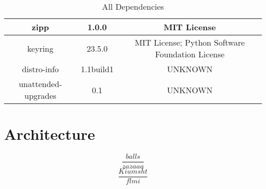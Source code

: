 \begin{table}[ht]
{\begin{tabular}{|c|c|c|}
zipp                & 1.0.0            & MIT License                                             \\ \hline
keyring             & 23.5.0           & MIT License; Python Software Foundation License         \\ \hline
distro-info         & 1.1build1        & UNKNOWN                                                 \\ \hline
unattended-upgrades & 0.1              & UNKNOWN                                                 \\ \hline
\end{tabular}%
}
\caption{All Dependencies}
\label{tab:dependencies}
\end{table}
                           


\section*{Architecture}

$$\frac{balls}{zazaaa}$$
$$\frac{Kiumsht}{flmi}$$